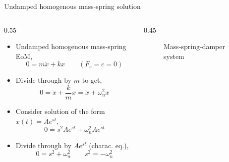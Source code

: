 \documentclass[11pt,aspectratio=169,handout]{beamer}
\begin{document}
\begin{frame}[c]{Undamped homogenous mass-spring solution}
	\begin{columns}[T]
		\begin{column}{0.55\textwidth}
			\begin{itemize}
				\item<1-> Undamped homogenous mass-spring EoM,
				\begin{equation}\label{}
					0 = m\ddot{x} + kx \quad \quad (F_e = c= 0)
				\end{equation}
				\item<2-> Divide through by $m$ to get,
				\begin{equation}\label{}
					0 = \ddot{x} + \frac{k}{m}x =  \ddot{x} + \omega_n^2 x 
				\end{equation}
				\item<3-> Consider solution of the form $x(t) = Ae^{st}$,
				\begin{equation}\label{}
					0 = s^2 Ae^{st} + \omega_n^2 Ae^{st}
				\end{equation}
				\item<4-> Divide through by $Ae^{st}$ (charac. eq.),
				\begin{equation}\label{}
					0 = s^2 + \omega_n^2  \quad\quad s^2 = -\omega_n^2
				\end{equation}
			\end{itemize}
		\end{column}
		\begin{column}{0.45\textwidth}
			\begin{figure}
				
				\caption{Mass-spring-damper system}
			\end{figure}
		\end{column}
	\end{columns}
\end{frame}
\end{document}
